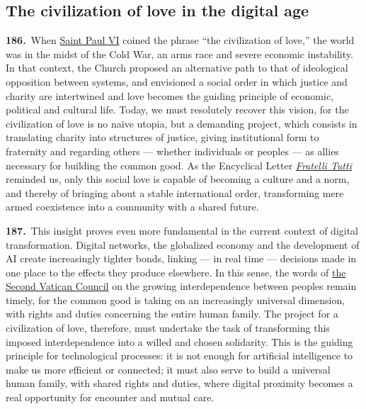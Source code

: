 \documentclass{article}
\begin{document}
\subsection{The civilization of love in the digital age}

\textbf{186.}\ When \href{https://www.vatican.va/content/paul-vi/en.html}{Saint Paul VI} coined the phrase ``the civilization of love,''\cite{n177} the world was in the midst of the Cold War, an arms race and severe economic instability. In that context, the Church proposed an alternative path to that of ideological opposition between systems, and envisioned a social order in which justice and charity are intertwined and love becomes the guiding principle of economic, political and cultural life. Today, we must resolutely recover this vision, for the civilization of love is no naïve utopia, but a demanding project, which consists in translating charity into structures of justice, giving institutional form to fraternity and regarding others --- whether individuals or peoples --- as allies necessary for building the common good. As the Encyclical Letter \href{https://www.vatican.va/content/francesco/en/encyclicals/documents/papa-francesco_20201003_enciclica-fratelli-tutti.html}{\emph{Fratelli Tutti}} reminded us, only this social love is capable of becoming a culture and a norm, and thereby of bringing about a stable international order, transforming mere armed coexistence into a community with a shared future.\cite{n178}

\textbf{187.}\ This insight proves even more fundamental in the current context of digital transformation. Digital networks, the globalized economy and the development of AI create increasingly tighter bonds, linking --- in real time --- decisions made in one place to the effects they produce elsewhere. In this sense, the words of \href{https://www.vatican.va/archive/hist_councils/ii_vatican_council/index.htm}{the Second Vatican Council} on the growing interdependence between peoples remain timely, for the common good is taking on an increasingly universal dimension, with rights and duties concerning the entire human family.\cite{n179} The project for a civilization of love, therefore, must undertake the task of transforming this imposed interdependence into a willed and chosen solidarity. This is the guiding principle for technological processes: it is not enough for artificial intelligence to make us more efficient or connected; it must also serve to build a universal human family, with shared rights and duties, where digital proximity becomes a real opportunity for encounter and mutual care.
\end{document}
